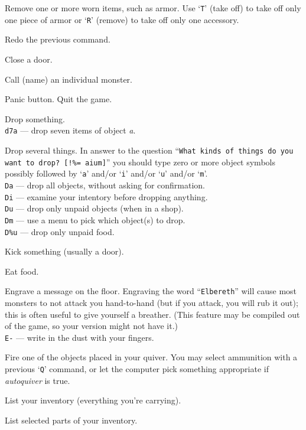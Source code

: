 \item[\tb{A}]
Remove one or more worn items, such as armor.
Use `{\tt T}' (take off) to take off only one piece of armor 
or `{\tt R}' (remove) to take off only one accessory.
\item[\tb{\^{}A}]
Redo the previous command.
\item[\tb{c}]
Close a door.
\item[\tb{C}]
Call (name) an individual monster.
\item[\tb{\^{}C}]
Panic button.  Quit the game.
\item[\tb{d}]
Drop something.\\
{\tt d7a} --- drop seven items of object
{\it a}.
\item[\tb{D}]
Drop several things.  In answer to the question
``{\tt What kinds of things do you want to drop? [!\%= aium]}''
you should type zero or more object symbols possibly followed by
`{\tt a}' and/or `{\tt i}' and/or `{\tt u}' and/or `{\tt m}'.\\
{\tt Da}  --- drop all objects, without asking for confirmation.\\
{\tt Di}  --- examine your intentory before dropping anything.\\
{\tt Du}  --- drop only unpaid objects (when in a shop).\\
{\tt Dm}  --- use a menu to pick which object(s) to drop.\\
{\tt D\%u} --- drop only unpaid food.
\item[\tb{\^{}D}]
Kick something (usually a door).
\item[\tb{e}]
Eat food.
\item[\tb{E}]
Engrave a message on the floor.
Engraving the word ``{\tt Elbereth}'' will cause most monsters to not attack
you hand-to-hand (but if you attack, you will rub it out); this is
often useful to give yourself a breather.  (This feature may be compiled out
of the game, so your version might not have it.)\\
{\tt E-} --- write in the dust with your fingers.
\item[\tb{f}]
Fire one of the objects placed in your quiver.  You may select
ammunition with a previous `{\tt Q}' command, or let the computer pick
something appropriate if {\it autoquiver\/} is true.
\item[\tb{i}]
List your inventory (everything you're carrying).
\item[\tb{I}]
List selected parts of your inventory.\\

